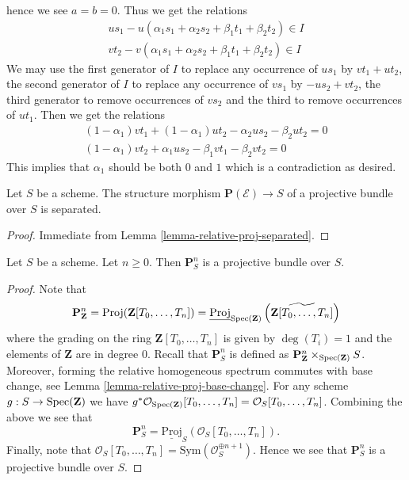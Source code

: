 \begin{example}
hence we see $a = b = 0$. Thus we get the relations
$$
\begin{matrix}
us_1 - u(\alpha_1s_1 + \alpha_2s_2 + \beta_1t_1 + \beta_2t_2)
\in I \\
vt_2 - v(\alpha_1s_1 + \alpha_2s_2 + \beta_1t_1 + \beta_2t_2)
\in I
\end{matrix}
$$
We may use the first generator of $I$ to replace any occurrence of
$us_1$ by $vt_1 + ut_2$, the second generator of $I$ to replace any
occurrence of $vs_1$ by $-us_2 + vt_2$, the third generator
to remove occurrences of $vs_2$ and the third to remove occurrences
of $ut_1$. Then we get the relations
$$
\begin{matrix}
(1 - \alpha_1)vt_1 + (1 - \alpha_1)ut_2 - \alpha_2us_2 - \beta_2ut_2 = 0 \\
(1 - \alpha_1)vt_2 + \alpha_1us_2 - \beta_1vt_1 - \beta_2vt_2 = 0
\end{matrix}
$$
This implies that $\alpha_1$ should be both $0$ and $1$ which is
a contradiction as desired.
\end{example}


\begin{lemma}
\label{lemma-projective-bundle-separated}
Let $S$ be a scheme.
The structure morphism $\mathbf{P}(\mathcal{E}) \to S$ of a
projective bundle over $S$ is separated.
\end{lemma}

\begin{proof}
Immediate from Lemma \ref{lemma-relative-proj-separated}.
\end{proof}

\begin{lemma}
\label{lemma-projective-space-bundle}
Let $S$ be a scheme. Let $n \geq 0$. Then
$\mathbf{P}^n_S$ is a projective bundle over $S$.
\end{lemma}

\begin{proof}
Note that
$$
\mathbf{P}^n_{\mathbf{Z}} =
\text{Proj}(\mathbf{Z}[T_0, \ldots, T_n]) =
\underline{\text{Proj}}_{\mathop{\mathrm{Spec}}(\mathbf{Z})}
\left(\widetilde{\mathbf{Z}[T_0, \ldots, T_n]}\right)
$$
where the grading on the ring $\mathbf{Z}[T_0, \ldots, T_n]$ is given by
$\deg(T_i) = 1$ and the elements of $\mathbf{Z}$ are in degree $0$.
Recall that $\mathbf{P}^n_S$ is defined as
$\mathbf{P}^n_{\mathbf{Z}} \times_{\mathop{\mathrm{Spec}}(\mathbf{Z})} S$.
Moreover, forming the relative homogeneous spectrum commutes with base change,
see Lemma \ref{lemma-relative-proj-base-change}.
For any scheme $g : S \to \mathop{\mathrm{Spec}}(\mathbf{Z})$ we have
$g^*\mathcal{O}_{\mathop{\mathrm{Spec}}(\mathbf{Z})}[T_0, \ldots, T_n]
= \mathcal{O}_S[T_0, \ldots, T_n]$.
Combining the above we see that
$$
\mathbf{P}^n_S = \underline{\text{Proj}}_S(\mathcal{O}_S[T_0, \ldots, T_n]).
$$
Finally, note that
$\mathcal{O}_S[T_0, \ldots, T_n] = \text{Sym}(\mathcal{O}_S^{\oplus n + 1})$.
Hence we see that $\mathbf{P}^n_S$ is a projective bundle over $S$.
\end{proof}



